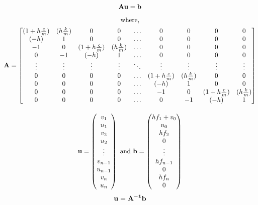 \begin{gather}
\mathbf{A} \mathbf{u} = \mathbf{b}\label{eq227}\\[5pt]
\text{where,}\notag\\ \mathbf{A} = 
\begin{bmatrix}
           (1 + h\frac{c}{m}) & (h\frac{k}{m}) & 0 & 0 & \ldots & 0 & 0 & 0 & 0\\
           (-h) & 1 & 0 & 0 & \ldots & 0 & 0 & 0 & 0\\
           -1 & 0 & (1 + h\frac{c}{m}) & (h\frac{k}{m}) & \ldots & 0 & 0 & 0 & 0\\
           0 & -1 &  (-h) & 1 & \ldots & 0 & 0 & 0 & 0\\
           \vdots & \vdots & \vdots & \vdots & \ddots &\vdots & \vdots&\vdots & \vdots\\           0 & 0 & 0 & 0 &\ldots & (1 + h\frac{c}{m}) & (h\frac{k}{m}) & 0 & 0\\
           0 & 0 & 0 & 0 &\ldots & (-h) & 1 & 0 & 0\\
           0 & 0 & 0 & 0 &\ldots & -1 & 0 & (1 + h\frac{c}{m}) & (h\frac{k}{m})\\
           0 & 0 & 0 & 0 &\ldots & 0 & -1 & (-h) & 1
\end{bmatrix}\notag\\[10pt]
\mathbf{u} =
\begin{pmatrix}
           v_{1}\\
           u_{1}\\
           v_{2}\\
           u_{2}\\
           \vdots \\
           v_{n-1}\\
           u_{n-1}\\
           v_{n}\\
           u_{n}\\
\end{pmatrix} \text{ and } 
\mathbf{b}=
\begin{pmatrix}
          h f_1 + v_0\\
           u_0\\
           h f_2\\
           0 \\
           \vdots \\
           h f_{n-1}\\
           0 \\
           h f_{n}\\
           0 \\
\end{pmatrix} \notag
\end{gather}
\begin{equation}
\\[5pt]
\mathbf{u} = \mathbf{A^{-1}} \mathbf{b} \label{eq228}
\end{equation}

